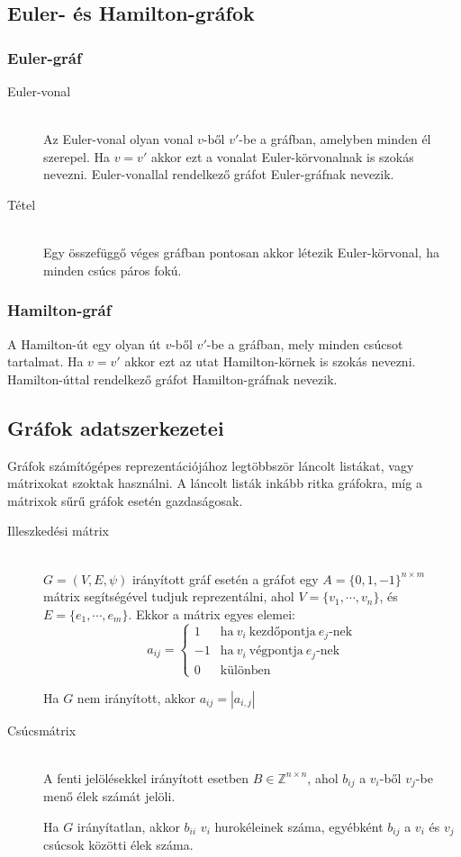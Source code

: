 \documentclass[margin=0px]{article}
\newcommand{\Z}{\mathbb{Z}}
\begin{document}
		\subsection{Euler- és Hamilton-gráfok}
			\subsubsection{Euler-gráf}
				\begin{description}
					\item[Euler-vonal] \hfill \\
							Az Euler-vonal olyan vonal $v$-ből $v'$-be a gráfban, amelyben minden él szerepel. Ha $v=v'$ akkor ezt a vonalat Euler-körvonalnak  is szokás nevezni. Euler-vonallal rendelkező gráfot Euler-gráfnak nevezik.
					\item[Tétel] \hfill \\
						Egy összefüggő véges gráfban pontosan akkor létezik Euler-körvonal, ha minden csúcs páros fokú.
				\end{description}
			\subsubsection{Hamilton-gráf}
					A Hamilton-út egy olyan út $v$-ből $v'$-be a gráfban, mely minden csúcsot tartalmat. Ha $v=v'$ akkor ezt az utat Hamilton-körnek is szokás nevezni. Hamilton-úttal rendelkező gráfot Hamilton-gráfnak nevezik.
		\subsection{Gráfok adatszerkezetei}
			Gráfok számítógépes reprezentációjához legtöbbször láncolt listákat, vagy mátrixokat szoktak használni. A láncolt listák inkább ritka gráfokra, míg a mátrixok sűrű gráfok esetén gazdaságosak.
			\begin{description}
				\item[Illeszkedési mátrix] \hfill \\
					$G = (V,E, \psi)$ irányított gráf esetén a gráfot egy $A = \{0,1,-1\}^{n\times m}$ mátrix segítségével tudjuk reprezentálni, ahol $V = \{v_1,\cdots, v_n\}$, és $E = \{e_1,\cdots,e_m\}$. Ekkor a mátrix egyes elemei:
					\[ a_{ij} = 
					\left\{
						\begin{array}{ll}
							1 & \mbox{ha} \ v_i \ \text{kezdőpontja} \ e_j\text{-nek} \\
							-1 &  \mbox{ha} \ v_i \ \text{végpontja} \ e_j\text{-nek} \\
							0 & \mbox{különben}
						\end{array}
					\right.
					\]
					
					Ha $G$ nem irányított, akkor $a_{ij} = |a_{i,j}|$
				\item[Csúcsmátrix] \hfill \\
					A  fenti jelölésekkel irányított esetben $B \in \Z^{n\times n}$, ahol $b_{ij}$ a $v_i$-ből $v_j$-be menő élek számát jelöli.
					
					Ha $G$ irányítatlan, akkor $b_{ii}$ $v_i$ hurokéleinek száma, egyébként $b_{ij}$ a $v_i$ és $v_j$ csúcsok közötti élek száma.
			\end{description}
\end{document}
